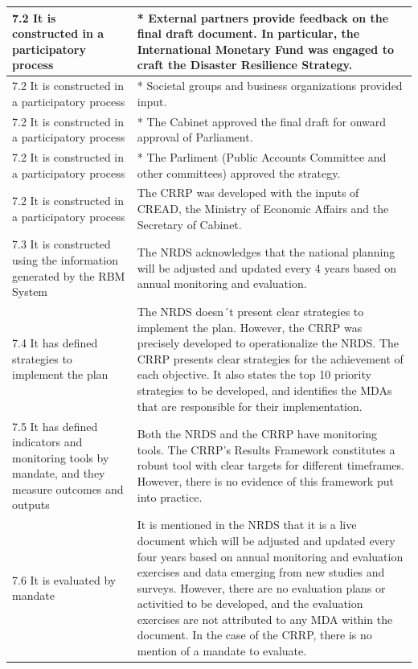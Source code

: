 \documentclass[
  10pt,
]{book}
\begin{document}
\begin{table}
\begin{tabular}[t]{l|l}
\hline
\hspace{1em}7.2 It is constructed in a participatory process & * External partners provide feedback on the final draft document. In particular, the International Monetary Fund was engaged to craft the Disaster Resilience Strategy.\\
\hline
\hspace{1em}7.2 It is constructed in a participatory process & * Societal groups and business organizations provided input.\\
\hline
\hspace{1em}7.2 It is constructed in a participatory process & * The Cabinet approved the final draft for onward approval of Parliament.\\
\hline
\hspace{1em}7.2 It is constructed in a participatory process & * The Parliment (Public Accounts Committee and other committees) approved the strategy.\\
\hline
\hspace{1em}7.2 It is constructed in a participatory process & The CRRP was developed with the inputs of CREAD, the Ministry of Economic Affairs and the Secretary of Cabinet.\\
\hline
\hspace{1em}7.3 It is constructed using the information generated by the RBM System & The NRDS acknowledges that the national planning will be adjusted and updated every 4 years based on annual monitoring and evaluation.\\
\hline
\hspace{1em}7.4 It has defined strategies to implement the plan & The NRDS doesn´t present clear strategies to implement the plan. However, the CRRP was precisely developed to operationalize the NRDS. The CRRP presents clear strategies for the achievement of each objective. It also states the top 10 priority strategies to be developed, and identifies the MDAs that are responsible for their implementation.\\
\hline
\hspace{1em}7.5 It has defined indicators and monitoring tools by mandate, and they measure outcomes and outputs & Both the NRDS and the CRRP have monitoring tools. The CRRP’s Results Framework constitutes a robust tool with clear targets for different timeframes. However, there is no evidence of  this framework put into practice.\\
\hline
\hspace{1em}7.6 It is evaluated by mandate & It is mentioned in the NRDS that it is a live document which will be adjusted and updated every four years based on annual monitoring and evaluation exercises and data emerging from new studies and surveys. However, there are no evaluation plans or activitied to be developed, and the evaluation exercises are not attributed to any MDA within the document. In the case of the CRRP, there is no mention of a mandate to evaluate.\\

\end{tabular}
\end{table}
\end{document}
